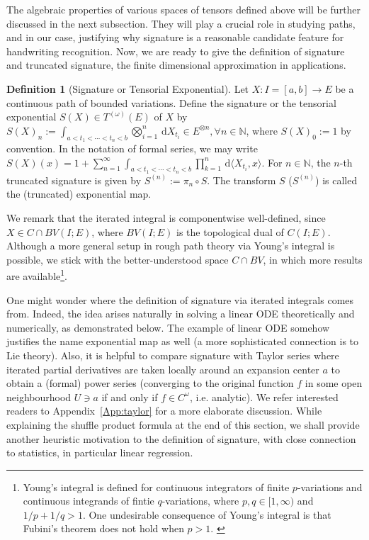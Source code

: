 \documentclass[fleqn]{article}
\theoremstyle{definition}
\newtheorem{defn}[thm]{Definition}
\theoremstyle{remark}
\renewcommand{\d}{\,\mathrm{d}} %
\begin{document}
The algebraic properties of various spaces of tensors defined above will be further discussed in the next subsection. They will play a crucial role in studying paths, and in our case, justifying why signature is a reasonable candidate feature for handwriting recognition. Now, we are ready to give the definition of signature and truncated signature, the finite dimensional approximation in applications.
\begin{defn}[Signature or Tensorial Exponential] \label{def:sig}
Let $X:I=[a,b]\to E$ be a continuous path of bounded variations. Define the signature or the tensorial exponential $S(X)\in T^{(\omega)}(E)$ of $X$ by $S(X)_n :=\int_{a<t_1<\cdots<t_n<b}\bigotimes_{i=1}^n \d X_{t_i} \in E^{\otimes n}, \forall n\in\mathbb{N}$, where $S(X)_0:=1$ by convention. In the notation of formal series, we may write $S(X)(x)=1+\sum_{n=1}^\infty \int_{a<t_1<\cdots<t_n<b} \prod_{k=1}^n \d \langle X_{t_i}, x\rangle$. For $n\in\mathbb{N}$, the $n$-th truncated signature is given by $S^{(n)}:=\pi_n \circ S$. The transform $S$ ($S^{(n)}$) is called the (truncated) exponential map.
\par
We remark that the iterated integral is componentwise well-defined, since $X\in C\cap BV(I;E)$, where $BV(I;E)$ is the topological dual of $C(I;E)$. Although a more general setup in rough path theory via Young's integral is possible, we stick with the better-understood space $C\cap BV$, in which more results are available\footnote{Young's integral is defined for continuous integrators of finite $p$-variations and continuous integrands of fintie $q$-variations, where $p,q\in[1,\infty)$ and $1/p+1/q>1$. One undesirable consequence of Young's integral is that Fubini's theorem does not hold when $p>1$. \label{ft:Young}}.
\end{defn}

One might wonder where the definition of signature via iterated integrals comes from. Indeed, the idea arises naturally in solving a linear ODE theoretically and numerically, as demonstrated below. The example of linear ODE somehow justifies the name exponential map as well (a more sophisticated connection is to Lie theory). Also, it is helpful to compare signature with Taylor series where iterated partial derivatives are taken locally around an expansion center $a$ to obtain a (formal) power series (converging to the original function $f$ in some open neighbourhood $U\ni a$ if and only if $f\in C^\omega$, i.e. analytic). We refer interested readers to Appendix~\ref{App:taylor} for a more elaborate discussion. While explaining the shuffle product formula at the end of this section, we shall provide another heuristic motivation to the definition of signature, with close connection to statistics, in particular linear regression.
\end{document}
